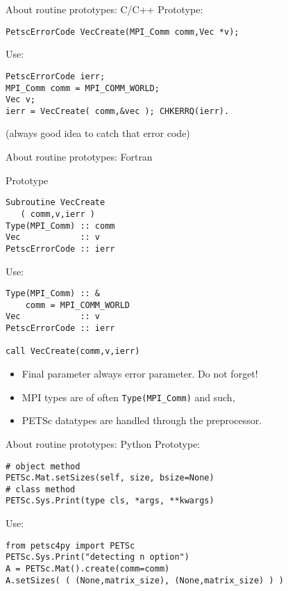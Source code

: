 
\begin{numberedframe}{About routine prototypes: C/C++}
  \label{sec:protos}
Prototype:
\begin{lstlisting}
PetscErrorCode VecCreate(MPI_Comm comm,Vec *v);
\end{lstlisting}
Use:
\begin{lstlisting}
PetscErrorCode ierr;
MPI_Comm comm = MPI_COMM_WORLD;
Vec v;
ierr = VecCreate( comm,&vec ); CHKERRQ(ierr).
\end{lstlisting}
(always good idea to catch that error code)
\end{numberedframe}

\lstset{language=Fortran}
\begin{numberedframe}{About routine prototypes: Fortran}
\begin{multicols}{2}
\footnotesize
Prototype
\begin{lstlisting}
Subroutine VecCreate
   ( comm,v,ierr )
Type(MPI_Comm) :: comm
Vec            :: v
PetscErrorCode :: ierr
\end{lstlisting}
Use:
\begin{lstlisting}
Type(MPI_Comm) :: &
    comm = MPI_COMM_WORLD
Vec            :: v
PetscErrorCode :: ierr

call VecCreate(comm,v,ierr)
\end{lstlisting}
\columnbreak
\begin{itemize}
\item Final parameter always error parameter. Do not forget!
\item MPI types are of often \lstinline{Type(MPI_Comm)} and such,
\item PETSc datatypes are handled through the preprocessor.
\end{itemize}
\hbox{}\vfill\hbox{}
\end{multicols}
\end{numberedframe}

\lstset{language=Python}
\begin{numberedframe}{About routine prototypes: Python}
Prototype:
\begin{lstlisting}
# object method
PETSc.Mat.setSizes(self, size, bsize=None)
# class method
PETSc.Sys.Print(type cls, *args, **kwargs)
\end{lstlisting}
Use:
\begin{lstlisting}
from petsc4py import PETSc
PETSc.Sys.Print("detecting n option")
A = PETSc.Mat().create(comm=comm)
A.setSizes( ( (None,matrix_size), (None,matrix_size) ) )
\end{lstlisting}
\end{numberedframe}

